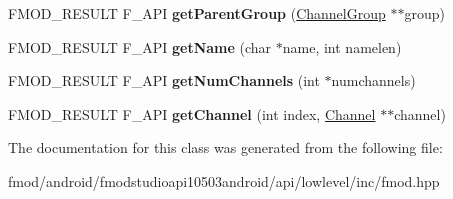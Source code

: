 \begin{DoxyCompactItemize}
\item 
\hypertarget{class_f_m_o_d_1_1_channel_group_ab953a5c6bf1dc0d25bed4af7c0653bee}{F\+M\+O\+D\+\_\+\+R\+E\+S\+U\+L\+T F\+\_\+\+A\+P\+I {\bfseries get\+Parent\+Group} (\hyperlink{class_f_m_o_d_1_1_channel_group}{Channel\+Group} $\ast$$\ast$group)}\label{class_f_m_o_d_1_1_channel_group_ab953a5c6bf1dc0d25bed4af7c0653bee}

\item 
\hypertarget{class_f_m_o_d_1_1_channel_group_a152e3dfbbde9a125c002845e8ffd9231}{F\+M\+O\+D\+\_\+\+R\+E\+S\+U\+L\+T F\+\_\+\+A\+P\+I {\bfseries get\+Name} (char $\ast$name, int namelen)}\label{class_f_m_o_d_1_1_channel_group_a152e3dfbbde9a125c002845e8ffd9231}

\item 
\hypertarget{class_f_m_o_d_1_1_channel_group_a31d5e3b8424b09069841b40633dee207}{F\+M\+O\+D\+\_\+\+R\+E\+S\+U\+L\+T F\+\_\+\+A\+P\+I {\bfseries get\+Num\+Channels} (int $\ast$numchannels)}\label{class_f_m_o_d_1_1_channel_group_a31d5e3b8424b09069841b40633dee207}

\item 
\hypertarget{class_f_m_o_d_1_1_channel_group_aadda005170e610a32c03473499b94823}{F\+M\+O\+D\+\_\+\+R\+E\+S\+U\+L\+T F\+\_\+\+A\+P\+I {\bfseries get\+Channel} (int index, \hyperlink{class_f_m_o_d_1_1_channel}{Channel} $\ast$$\ast$channel)}\label{class_f_m_o_d_1_1_channel_group_aadda005170e610a32c03473499b94823}

\end{DoxyCompactItemize}


The documentation for this class was generated from the following file\+:\begin{DoxyCompactItemize}
\item 
fmod/android/fmodstudioapi10503android/api/lowlevel/inc/fmod.\+hpp\end{DoxyCompactItemize}
